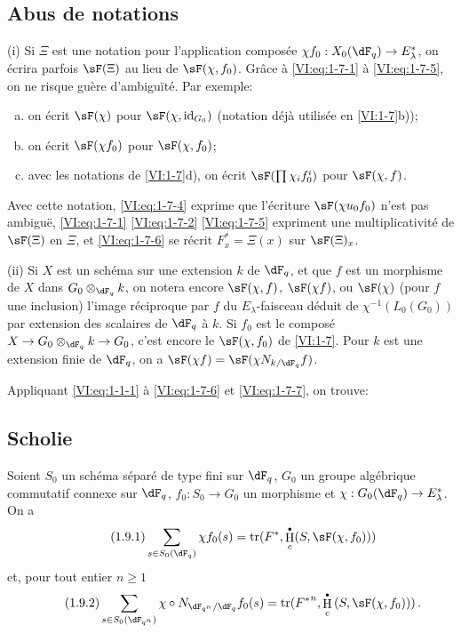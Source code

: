 \documentclass[oneside]{book}
\DeclareMathOperator{\h}{H}
\DeclareMathOperator{\tr}{tr}
\theoremstyle{sga-source}
\theoremstyle{sga-source-dash}
\theoremstyle{sga-source-dotdash}
\theoremstyle{sga-source-number-note-dash}
\theoremstyle{sga-source-note-number-dotdash}
\theoremstyle{sga-source-example-dotdash}
\theoremstyle{sga-source-inline-number}
\theoremstyle{sga-source-bare-number}
\theoremstyle{sga-source}
\let\oldbullet\bullet
\renewcommand{\bullet}{\textnormal{\tiny$\oldbullet$}}
\newcommand{\PrintPage}[1]{}\newcommand{\MathPage}[1]{}\newcommand{\PrintCite}[2]{#1}\newcommand{\var}[3]{#1}
\begin{document}
\subsection{Abus de notations}\label{VI:1-8}

(i) Si $\Xi$ est une notation pour l'application composée 
$\chi f_0:X_0(\dF_q) \to E_\lambda^\ast$, on écrira parfois $\sF(\Xi)$ au 
lieu de $\sF(\chi,f_0)$. Grâce à \eqref{VI:eq:1-7-1} à \eqref{VI:eq:1-7-5}, 
on ne risque guère d'ambiguïté. Par exemple:
\begin{enumerate}[a)]
  \item on écrit $\sF(\chi)$ pour $\sF(\chi,\operatorname{id}_{G_0})$ 
    (notation déjà utilisée en \ref{VI:1-7}b)); 
  \item on écrit $\sF(\chi f_0)$ pour $\sF(\chi,f_0)$;
  \item avec les notations de \ref{VI:1-7}d), on écrit 
    $\sF(\prod \chi_i f_0^i)$ pour $\var{\sF(\chi,f)}{\sF(\chi,f_0)}{S45-SOL-0690}$. 
\end{enumerate}

\PrintPage{174}
Avec cette notation, \eqref{VI:eq:1-7-4} exprime que l'écriture 
$\sF(\chi u_0 f_0)$ n'est pas ambiguë, \eqref{VI:eq:1-7-1} \eqref{VI:eq:1-7-2} 
\eqref{VI:eq:1-7-5} expriment une multiplicativité de $\sF(\Xi)$ en $\Xi$, 
et \eqref{VI:eq:1-7-6} se récrit $F_x^\ast = \Xi(x)$ sur $\sF(\Xi)_x$.

(ii) Si $X$ est un schéma sur une extension $k$ de $\dF_q$, et que $f$ est un 
morphisme de $X$ dans $G_0\otimes_{\dF_q} k$, on notera encore $\sF(\chi,f)$, 
$\sF(\chi f)$, ou $\sF(\chi)$ (pour $f$ une inclusion) l'image réciproque par 
$f$ du $E_\lambda$-faisceau déduit de $\chi^{-1}(L_0(G_0))$ par extension des 
scalaires de $\dF_q$ à $k$. Si $f_0$ est le composé 
$X\to G_0\otimes_{\dF_q} k \to G_0$, c'est encore le $\sF(\chi,f_0)$ de 
\ref{VI:1-7}. \var{Pour $k$ est une extension}{Pour $k$ une extension}{S45-SOL-0692} finie de $\dF_q$, on a 
$\sF(\chi f) = \sF(\chi N_{k/\dF_q} f)$. 

Appliquant \eqref{VI:eq:1-1-1} à \eqref{VI:eq:1-7-6} et \eqref{VI:eq:1-7-7}, 
on trouve: 





\subsection{Scholie}\label{VI:1-9}
Soient $S_0$ un schéma séparé de type fini sur $\dF_q$, $G_0$ un groupe 
algébrique commutatif connexe sur $\dF_q$, $f_0:S_0\to G_0$ un morphisme et 
$\chi:G_0(\dF_q) \to E_\lambda^\ast$. On a 
\begin{equation*}\tag{1.9.1}\label{VI:eq:1-9-1}
  \sum_{s\in S_0(\dF_q)} \chi f_0(s) = \tr(F^\ast,\h_c^\bullet(S,\sF(\chi,f_0))) 
\end{equation*}
et, pour tout entier $n\geqslant 1$
\begin{equation*}\tag{1.9.2}\label{VI:eq:1-9-2}
  \sum_{s\in S_0(\dF_{q^n})} \chi\circ N_{\dF_{q^n}/\dF_q} f_0(s) = \tr({F^\ast}^n, \h_c^\bullet\left(S,\sF(\chi,f_0))\right) \text{.}
\end{equation*}
\end{document}
